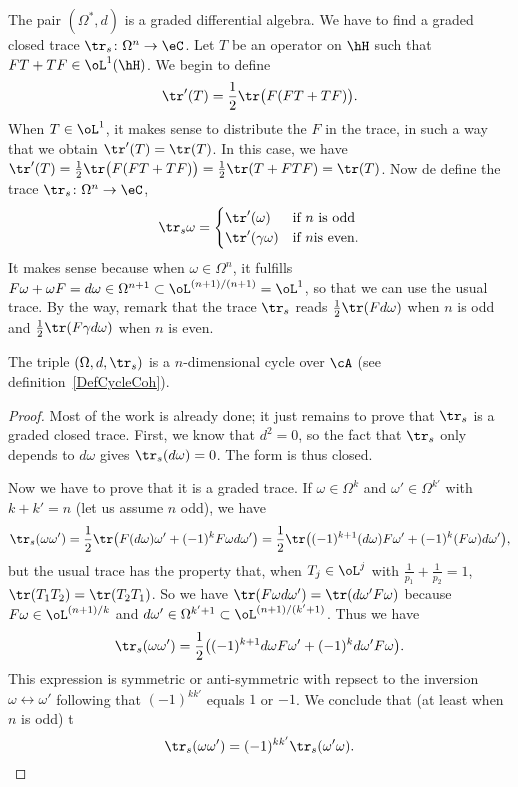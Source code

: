 The pair $(\Omega^*,d)$ is a graded differential algebra. We have to find a graded closed trace $\tr_s\colon \Omega^n\to \eC$. Let $T$ be an operator on $\hH$ such that $FT+TF\in\oL^1(\hH)$. We begin to define
\[
  \tr'(T)=\frac{ 1 }{2}\tr\big( F(FT+TF) \big).
\]
When $T\in\oL^1$, it makes sense to distribute the $F$ in the trace, in such a way that we obtain $\tr'(T)=\tr(T)$. In this case, we have
  $\tr'(T)=\frac{ 1 }{2}\tr\big( F(FT+TF) \big)=\frac{ 1 }{2}\tr(T+FTF)=\tr(T)$.
Now de define the trace $\tr_s\colon \Omega^n\to \eC$,
\[
  \tr_s\omega=
\begin{cases}
    \tr'(\omega)&\text{if }n \text{ is odd}\\
    \tr'(\gamma\omega)&\text{if }n \text{is even}.
\end{cases}
\]
It makes sense because when $\omega\in\Omega^n$, it fulfills $F\omega+\omega F=d\omega\in\Omega^{n+1}\subset\oL^{(n+1)/(n+1)}=\oL^1$, so that we can use the usual trace. By the way, remark that the trace $\tr_s$ reads $\frac{ 1 }{2}\tr(Fd\omega)$ when $n$ is odd and $\frac{ 1 }{2}\tr(F\gamma d\omega)$ when $n$ is even.

\begin{proposition}
	The triple $(\Omega,d,\tr_s)$ is a $n$-dimensional cycle over  $\cA$ (see definition~\ref{DefCycleCoh}).
\end{proposition}

\begin{proof}
Most of the work is already done; it just remains to prove that $\tr_s$ is a graded closed trace. First, we know that $d^2=0$, so the fact that $\tr_s$ only depends to $d\omega$ gives $\tr_s(d\omega)=0$. The form is thus closed.

Now we have to prove that it is a graded trace. If $\omega\in\Omega^k$ and $\omega'\in\Omega^{k'}$ with $k+k'=n$ (let us assume $n$ odd), we have
\[
  \tr_s(\omega\omega')=\frac{ 1 }{2}\tr\big( F(d\omega)\omega'+(-1)^{k}F\omega d\omega' \big)=\frac{ 1 }{2}\tr\big( (-1)^{k+1}(d\omega)F\omega'+(-1)^k(F\omega)d\omega' \big),
\]
but the usual trace has the property that, when $T_j\in\oL^j$ with $\frac{1}{ p_1 }+\frac{1}{ p_2 }=1$, $\tr(T_1T_2)=\tr(T_2T_1)$. So we have $\tr(F\omega d\omega')=\tr(d\omega'F\omega)$ because $F\omega\in\oL^{(n+1)/  k }$ and $d\omega'\in\Omega^{k'+1}\subset\oL^{(n+1)/(k'+1)}$. Thus we have
\[
  \tr_s(\omega\omega')=\frac{ 1 }{2}\big( (-1)^{k+1}d\omega F\omega'+(-1)^kd\omega' F\omega \big).
\]
This expression is symmetric or anti-symmetric with repsect to the inversion $\omega\leftrightarrow\omega'$ following that $(-1)^{kk'}$ equals $1$ or $-1$. We conclude that (at least when $n$ is odd) t
\[
  \tr_s(\omega\omega')=(-1)^{kk'}\tr_s(\omega'\omega).
\]
\end{proof}

